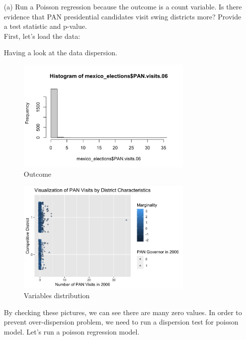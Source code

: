 \documentclass[12pt,letterpaper]{article}
\begin{document}
\begin{enumerate}
	\item [(a)]
	Run a Poisson regression because the outcome is a count variable. Is there evidence that PAN presidential candidates visit swing districts more? Provide a test statistic and p-value.\vspace{.15cm}\\
	\noindent First, let's load the data:
			
			
	\noindent Having a look at the data dispersion.
				
	\begin{figure}[htbp]
		\centering
		\includegraphics[width=0.8\textwidth]{Data dispersion histogram in R.png} 
		\caption{Outcome} 
		\label{fig: Outcome} 
	\end{figure}
	\begin{figure}[htbp]
		\centering
		\includegraphics[width=0.8\textwidth]{Data dispersion in R.png} 
		\caption{Variables distribution} 
		\label{fig: Variables distribution} 
	\end{figure}
	
	\newpage
	\noindent By checking these pictures, we can see there are many zero values. In order to prevent over-dispersion problem, we need to run a dispersion test for poisson model. Let's run a poisson regression model.
			
	

\end{enumerate}
\end{document}
